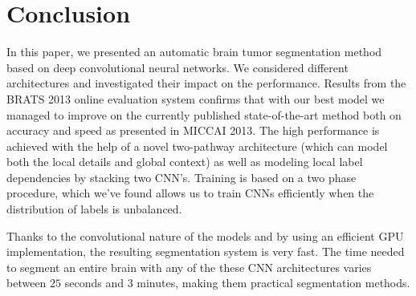 \documentclass[final,5p,times,twocolumn]{elsarticle}
\begin{document}
{\begin{table}[]
\begin{center}
{\begin{tabular}{*{4}{c}}
\end{tabular}
}
\end{center}
\label{tab:brats12}
\end{table}

\section{Conclusion}

In this paper, we presented an automatic brain tumor segmentation method based on deep convolutional neural networks.  We considered different architectures and investigated their impact on the performance. Results from the BRATS 2013 online evaluation system confirms that with our best model we managed to improve on the currently published state-of-the-art method both on accuracy and speed as presented in MICCAI 2013.  The high performance is achieved with the help of a novel two-pathway architecture (which can model both the local details and global context) as well as modeling local label dependencies by stacking two CNN's. %
Training is based on a two phase procedure, which we've found allows us to train CNNs efficiently when the distribution of labels is unbalanced.

Thanks to the convolutional nature of the models and by using an efficient GPU implementation, the resulting segmentation system is very fast. The time needed to segment an entire brain with any of the these CNN architectures varies between $25$ seconds and $3$ minutes, making them practical segmentation methods.


}
\end{document}
